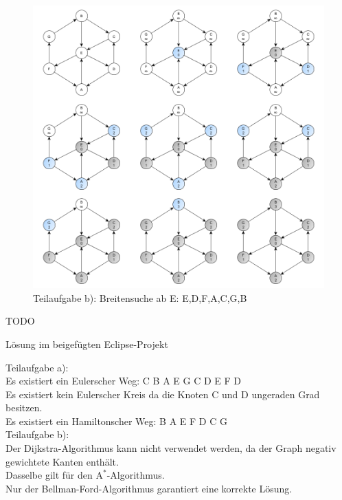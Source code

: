 \documentclass[12pt]{scrartcl}
\begin{document}
\begin{figure}[h!]
\begin{center}
\includegraphics[scale=0.5]{EBreitensuche.png}
\caption{Teilaufgabe b): Breitensuche ab E: E,D,F,A,C,G,B}
\end{center}
\end{figure}

\exercise{}
TODO

\exercise{}
Lösung im beigefügten Eclipse-Projekt

\exercise{}
Teilaufgabe a):\\
Es existiert ein Eulerscher Weg: C B A E G C D E F D\\
Es existiert kein Eulerscher Kreis da die Knoten C und D ungeraden Grad besitzen.\\
Es existiert ein Hamiltonscher Weg: B A E F D C G\\
Teilaufgabe b):\\
Der Dijkstra-Algorithmus kann nicht verwendet werden, da der Graph negativ gewichtete Kanten enthält.\\
Dasselbe gilt für den $\text{A}^*$-Algorithmus.\\
Nur der Bellman-Ford-Algorithmus garantiert eine korrekte Lösung. 




\end{document}
